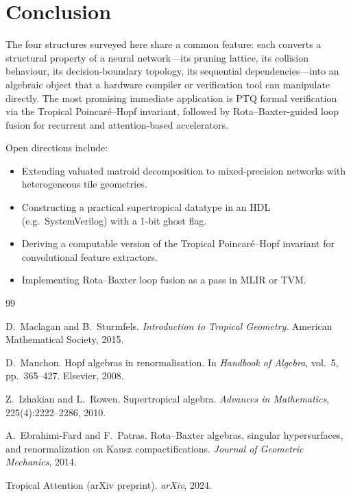 \documentclass[11pt]{article}
\begin{document}
\section{Conclusion}

The four structures surveyed here share a common feature: each converts a structural property of a neural network---its pruning lattice, its collision behaviour, its decision-boundary topology, its sequential dependencies---into an algebraic object that a hardware compiler or verification tool can manipulate directly. The most promising immediate application is PTQ formal verification via the Tropical Poincar\'{e}--Hopf invariant, followed by Rota--Baxter-guided loop fusion for recurrent and attention-based accelerators.

Open directions include:
\begin{itemize}[leftmargin=*]
\item Extending valuated matroid decomposition to mixed-precision networks with heterogeneous tile geometries.
\item Constructing a practical supertropical datatype in an HDL (e.g.\ SystemVerilog) with a 1-bit ghost flag.
\item Deriving a computable version of the Tropical Poincar\'{e}--Hopf invariant for convolutional feature extractors.
\item Implementing Rota--Baxter loop fusion as a pass in MLIR or TVM.
\end{itemize}

\begin{thebibliography}{99}

D.\ Maclagan and B.\ Sturmfels.
\newblock \emph{Introduction to Tropical Geometry}.
\newblock American Mathematical Society, 2015.

D.\ Manchon.
\newblock Hopf algebras in renormalisation.
\newblock In \emph{Handbook of Algebra}, vol.~5, pp.~365--427. Elsevier, 2008.

Z.\ Izhakian and L.\ Rowen.
\newblock Supertropical algebra.
\newblock \emph{Advances in Mathematics}, 225(4):2222--2286, 2010.

A.\ Ebrahimi-Fard and F.\ Patras.
\newblock Rota--Baxter algebras, singular hypersurfaces, and renormalization on Kausz compactifications.
\newblock \emph{Journal of Geometric Mechanics}, 2014.

Tropical Attention (arXiv preprint).
\newblock \emph{arXiv}, 2024.

\end{thebibliography}
\end{document}
